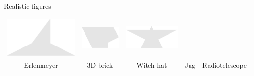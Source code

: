 \documentclass[14pt]{beamer}
\begin{document}
\begin{frame}{Realistic figures}
\begin{center}
{\begin{tabular}{ccccc}
                \!\!\includegraphics[scale=0.20]{figures/figure026bd.pdf} \!\!&
                \!\!\includegraphics[scale=0.20]{figures/figure026bb.pdf} \!\!&
                \!\!\includegraphics[scale=0.20]{figures/figure026ak.pdf} \!\!\\
                Erlenmeyer & 3D brick\;\; & Witch hat & Jug\;\; & Radiotelescope\\
            \end{tabular}}
        \end{center}
    \end{frame}

\end{document}
